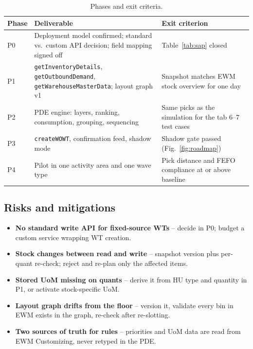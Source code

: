 \documentclass[11pt,a4paper]{article}
\newcommand{\api}[1]{\texttt{#1}}
\begin{document}
\begin{table}[H]
\centering\small
\begin{tabularx}{\linewidth}{@{}l X X@{}}
\toprule
\textbf{Phase} & \textbf{Deliverable} & \textbf{Exit criterion}\\
\midrule
P0 & Deployment model confirmed; standard vs.\ custom API decision; field mapping signed off & Table~\ref{tab:sap} closed \\
P1 & \api{getInventoryDetails}, \api{getOutboundDemand}, \api{getWarehouseMasterData}; layout graph v1 & Snapshot matches EWM stock overview for one day \\
P2 & PDE engine: layers, ranking, consumption, grouping, sequencing & Same picks as the simulation for the tab 6--7 test cases \cite{sim} \\
P3 & \api{createWOWT}, confirmation feed, shadow mode & Shadow gate passed (Fig.~\ref{fig:roadmap}) \\
P4 & Pilot in one activity area and one wave type & Pick distance and FEFO compliance at or above baseline \\
\bottomrule
\end{tabularx}
\caption{Phases and exit criteria.}
\label{tab:phases}
\end{table}

\subsection{Risks and mitigations}
\begin{itemize}[leftmargin=*,itemsep=2pt]
  \item \textbf{No standard write API for fixed-source WTs} -- decide in P0; budget a custom service wrapping WT creation.
  \item \textbf{Stock changes between read and write} -- snapshot version plus per-quant re-check; reject and re-plan only the affected items.
  \item \textbf{Stored UoM missing on quants} -- derive it from HU type and quantity in P1, or activate stock-specific UoM.
  \item \textbf{Layout graph drifts from the floor} -- version it, validate every bin in EWM exists in the graph, re-check after re-slotting.
  \item \textbf{Two sources of truth for rules} -- priorities and UoM data are read from EWM Customizing, never retyped in the PDE.
\end{itemize}
\end{document}
